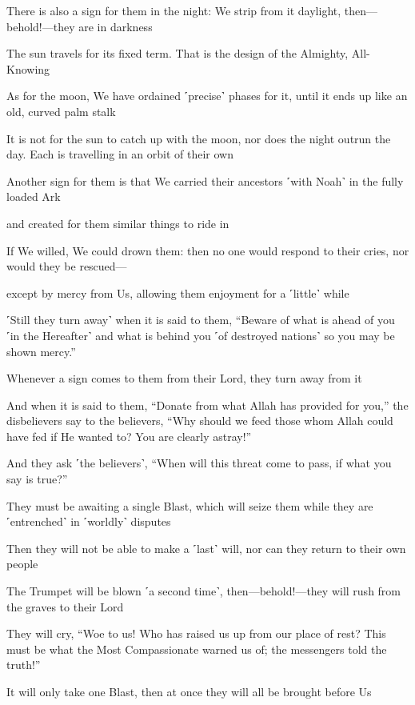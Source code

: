 There is also a sign for them in the night: We strip from it daylight, then—behold!—they are in darkness

The sun travels for its fixed term. That is the design of the Almighty, All-Knowing

As for the moon, We have ordained ˹precise˺ phases for it, until it ends up like an old, curved palm stalk

It is not for the sun to catch up with the moon, nor does the night outrun the day. Each is travelling in an orbit of their own

Another sign for them is that We carried their ancestors ˹with Noah˺ in the fully loaded Ark

and created for them similar things to ride in

If We willed, We could drown them: then no one would respond to their cries, nor would they be rescued—

except by mercy from Us, allowing them enjoyment for a ˹little˺ while

˹Still they turn away˺ when it is said to them, “Beware of what is ahead of you ˹in the Hereafter˺ and what is behind you ˹of destroyed nations˺ so you may be shown mercy.”

Whenever a sign comes to them from their Lord, they turn away from it

And when it is said to them, “Donate from what Allah has provided for you,” the disbelievers say to the believers, “Why should we feed those whom Allah could have fed if He wanted to? You are clearly astray!”

And they ask ˹the believers˺, “When will this threat come to pass, if what you say is true?”

They must be awaiting a single Blast, which will seize them while they are ˹entrenched˺ in ˹worldly˺ disputes

Then they will not be able to make a ˹last˺ will, nor can they return to their own people

The Trumpet will be blown ˹a second time˺, then—behold!—they will rush from the graves to their Lord

They will cry, “Woe to us! Who has raised us up from our place of rest? This must be what the Most Compassionate warned us of; the messengers told the truth!”

It will only take one Blast, then at once they will all be brought before Us

